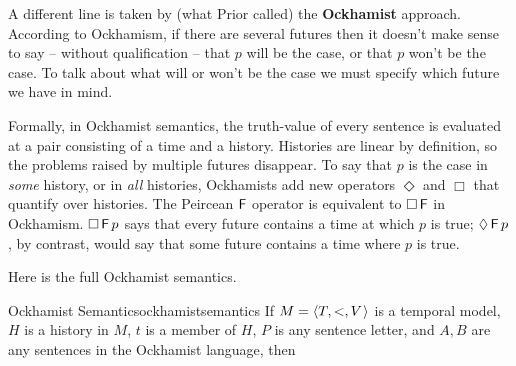 A different line is taken by (what Prior called) the \textbf{Ockhamist}
approach. According to Ockhamism, if there are several futures then it doesn't
make sense to say -- without qualification -- that $p$ will be the case, or that
$p$ won't be the case. To talk about what will or won't be the case we must specify
which future we have in mind.

Formally, in Ockhamist semantics, the truth-value of every sentence is evaluated
at a pair consisting of a time and a history. Histories are linear by
definition, so the problems raised by multiple futures disappear. To say that
$p$ is the case in \emph{some} history, or in \emph{all} histories, Ockhamists
add new operators $\Diamond$ and $\Box$ that quantify over histories. The
Peircean $\operatorname{\mathsf{F}}$ operator is equivalent to $\Box \operatorname{\mathsf{F}}$ in Ockhamism. $\Box \operatorname{\mathsf{F}} p$
says that every future contains a time at which $p$ is true; $\Diamond \operatorname{\mathsf{F}} p$, by
contrast, would say that some future contains a time where $p$ is true.

Here is the full Ockhamist semantics.

\begin{definition}{Ockhamist Semantics}{ockhamistsemantics}
  If $M = \t{T,<,V}$ is a temporal model, $H$ is a history in $M$, $t$
  is a member of $H$, $P$ is any sentence letter, and $A,B$ are any
  sentences in the Ockhamist language, then

  \medskip
  \begin{semantics}
  \end{semantics}
\end{definition}

